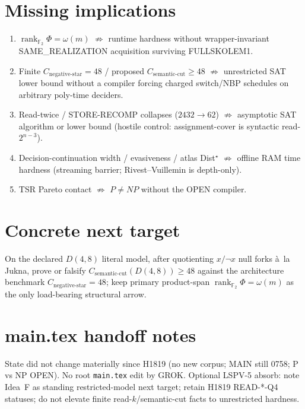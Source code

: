 \documentclass[11pt]{article}
\begin{document}
\section*{Missing implications}
\begin{enumerate}
\item $\operatorname{rank}_{\mathbb F_2}\Phi=\omega(m)$ $\not\Rightarrow$ runtime hardness without
  wrapper-invariant SAME\_REALIZATION acquisition surviving FULLSKOLEM1.
\item Finite $C_{\mathrm{negative\textrm{-}star}}=48$ / proposed $C_{\mathrm{semantic\textrm{-}cut}}\ge48$
  $\not\Rightarrow$ unrestricted SAT lower bound without a compiler forcing charged switch/NBP
  schedules on arbitrary poly-time deciders.
\item Read-twice / STORE-RECOMP collapses ($2432\to62$) $\not\Rightarrow$ asymptotic SAT algorithm
  or lower bound (hostile control: assignment-cover is syntactic read-$2^{n-3}$).
\item Decision-continuation width / evasiveness / atlas Dist$^\star$ $\not\Rightarrow$ offline
  RAM time hardness (streaming barrier; Rivest--Vuillemin is depth-only).
\item TSR Pareto contact $\not\Rightarrow$ $P\neq NP$ without the OPEN compiler.
\end{enumerate}

\section*{Concrete next target}
On the declared $D(4,8)$ literal model, after quotienting $x/\neg x$ null forks \`a~la Jukna,
prove or falsify $C_{\mathrm{semantic\textrm{-}cut}}(D(4,8))\ge 48$ against the architecture
benchmark $C_{\mathrm{negative\textrm{-}star}}=48$; keep primary product-span
$\operatorname{rank}_{\mathbb F_2}\Phi=\omega(m)$ as the only load-bearing structural arrow.

\section*{main.tex handoff notes}
State did not change materially since H1819 (no new corpus; MAIN still 0758; P vs NP OPEN).
No root \texttt{main.tex} edit by GROK. Optional LSPV-5 absorb: note Idea~F as standing
restricted-model next target; retain H1819 READ-*-Q4 statuses; do not elevate finite
read-$k$/semantic-cut facts to unrestricted hardness.

\end{document}
